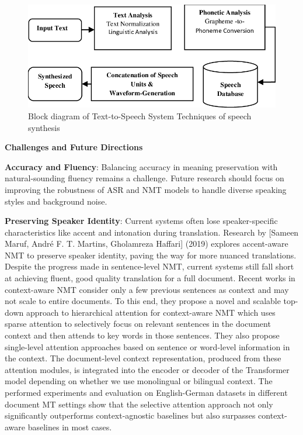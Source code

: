 \documentclass[12px, a4paper]{article}
\begin{document}
\begin{figure}[!htb]
    \includegraphics[width=\textwidth]{texttospeech.png}
    \caption{Block diagram of Text-to-Speech System Techniques of speech synthesis}
\end{figure}

\textbf{Challenges and Future Directions}

\textbf{Accuracy and Fluency}: Balancing accuracy in meaning preservation with natural-sounding fluency remains a challenge. Future research should focus on improving the robustness of ASR and NMT models to handle diverse speaking styles and background noise.

\textbf{Preserving Speaker Identity}: Current systems often lose speaker-specific characteristics like accent and intonation during translation. Research by [Sameen Maruf, André F. T. Martins, Gholamreza Haffari] (2019) explores accent-aware NMT to preserve speaker identity, paving the way for more nuanced translations. Despite the progress made in sentence-level NMT, current systems still fall short at achieving fluent, good quality translation for a full document. Recent works in context-aware NMT consider only a few previous sentences as context and may not scale to entire documents. To this end, they propose a novel and scalable top-down approach to hierarchical attention for context-aware NMT which uses sparse attention to selectively focus on relevant sentences in the document context and then attends to key words in those sentences. They also propose single-level attention approaches based on sentence or word-level information in the context. The document-level context representation, produced from these attention modules, is integrated into the encoder or decoder of the Transformer model depending on whether we use monolingual or bilingual context. The performed experiments and evaluation on English-German datasets in different document MT settings show that the selective attention approach not only significantly outperforms context-agnostic baselines but also surpasses context-aware baselines in most cases.
\end{document}

